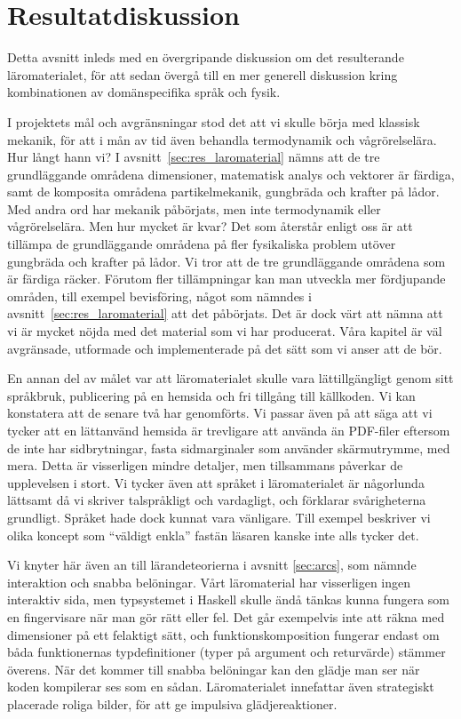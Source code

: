 \section{Resultatdiskussion}\label{sec:res_disk}

Detta avsnitt inleds med en övergripande diskussion om det resulterande
läromaterialet, för att sedan övergå till en mer generell diskussion kring
kombinationen av domänspecifika språk och fysik.

I projektets mål och avgränsningar stod det att vi skulle börja med klassisk
mekanik, för att i mån av tid även behandla termodynamik och vågrörelselära. Hur långt
hann vi? I avsnitt~\ref{sec:res_laromaterial} nämns att de tre grundläggande
områdena dimensioner, matematisk analys och vektorer är färdiga, samt de
komposita områdena partikelmekanik, gungbräda och krafter på lådor. Med andra
ord har mekanik påbörjats, men inte termodynamik eller vågrörelselära. Men hur mycket är
kvar? Det som återstår enligt oss är att tillämpa de grundläggande områdena på
fler fysikaliska problem utöver gungbräda och krafter på lådor. Vi tror att de
tre grundläggande områdena som är färdiga räcker. Förutom fler tillämpningar kan
man utveckla mer fördjupande områden, till exempel bevisföring, något som
nämndes i avsnitt~\ref{sec:res_laromaterial} att det påbörjats. Det är dock värt
att nämna att vi är mycket nöjda med det material som vi har producerat. Våra
kapitel är väl avgränsade, utformade och implementerade på det sätt som vi
anser att de bör.

En annan del av målet var att läromaterialet skulle vara lättillgängligt genom
sitt språkbruk, publicering på en hemsida och fri tillgång till källkoden.
Vi kan konstatera att de senare två har genomförts. Vi passar även på att
säga att vi tycker att en lättanvänd hemsida är trevligare att använda än
PDF-filer eftersom de inte har sidbrytningar, fasta sidmarginaler som använder
skärmutrymme, med mera. Detta är visserligen mindre detaljer, men tillsammans
påverkar de upplevelsen i stort. Vi
tycker även att språket i läromaterialet är någorlunda lättsamt då vi skriver
talspråkligt och vardagligt, och förklarar svårigheterna grundligt. Språket hade
dock kunnat vara vänligare. Till exempel beskriver vi olika koncept som
``väldigt enkla'' fastän läsaren kanske inte alls tycker det.

Vi knyter här även an till lärandeteorierna i avsnitt \ref{sec:arcs}, som nämnde interaktion och snabba belöningar. Vårt läromaterial har visserligen ingen interaktiv sida, men typsystemet i Haskell skulle ändå tänkas kunna fungera som en fingervisare när man gör rätt eller fel. Det går exempelvis inte att räkna med dimensioner på ett felaktigt sätt, och funktionskomposition fungerar endast om båda funktionernas typdefinitioner (typer på argument och returvärde) stämmer överens. När det kommer till snabba belöningar kan den glädje man ser när koden kompilerar ses som en sådan. Läromaterialet innefattar även strategiskt placerade roliga bilder, för att ge impulsiva glädjereaktioner.

